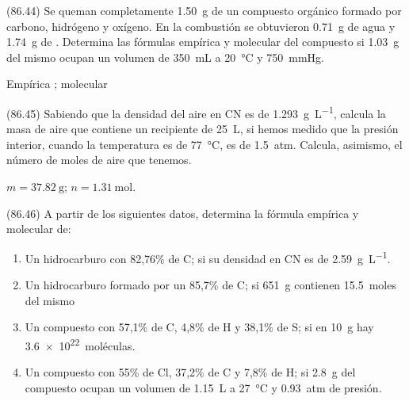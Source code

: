 \documentclass[10pt,a5paper,twoside]{article}
\begin{document}
  \begin{exercise}[
      tags    = {},
      topics  = {química,química básica},
      source  = {FQ 1B MGH 2016, p86, e44},
    ]
    (86.44) Se queman completamente \SI{1.50}{\gram} de un compuesto orgánico
    formado por carbono, hidrógeno y oxígeno. En la combustión
    se obtuvieron \SI{0.71}{\gram} de agua y \SI{1.74}{\gram} de . Determina las fórmulas empírica y molecular del compuesto si
    \SI{1.03}{\gram} del mismo ocupan un volumen de \SI{350}{\milli\liter} a \SI{20}{\celsius} y \SI{750}{\mmHg}.
  \end{exercise}

  \begin{solution}
    Empírica ; molecular 
  \end{solution}




  \begin{exercise}[
      tags    = {},
      topics  = {química,química básica},
      source  = {FQ 1B MGH 2016, p86, e45},
    ]
    (86.45) Sabiendo que la densidad del aire en CN es de \SI{1.293}{\gram\per\liter}, calcula la masa de aire que contiene un recipiente de \SI{25}{\liter}, si hemos medido que la presión interior, cuando la temperatura es de \SI{77}{\celsius}, es de \SI{1.5}{atm}. Calcula, asimismo, el número de moles de aire que tenemos.
  \end{exercise}

  \begin{solution}
    \( m = \SI{37.82}{\gram} \); \( n = \SI{1.31}{\mole} \).
  \end{solution}




  \begin{exercise}[
      tags    = {},
      topics  = {química,química básica},
      source  = {FQ 1B MGH 2016, p86, e46},
    ]
    (86.46) A partir de los siguientes datos, determina la fórmula empírica y molecular de:

    \begin{enumerate}
      \item Un hidrocarburo con 82,76\% de C; si su densidad en CN es de \SI{2.59}{\gram\per\liter}.
      \item Un hidrocarburo formado por un 85,7\% de C; si \SI{651}{\gram} contienen \SI{15.5}{moles} del mismo
      \item Un compuesto con 57,1\% de C, 4,8\% de H y 38,1\% de S; si en \SI{10}{\gram} hay \SI{3.6e22}{moléculas}.
      \item Un compuesto con 55\% de Cl, 37,2\% de C y 7,8\% de H; si \SI{2.8}{\gram} del compuesto ocupan un volumen de \SI{1.15}{\liter} a \SI{27}{\celsius} y \SI{0.93}{atm} de presión.
    \end{enumerate}
  \end{exercise}
\end{document}
